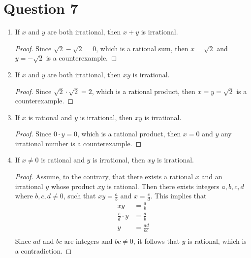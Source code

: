 \documentclass[11pt, oneside]{article}   	%
\begin{document}
\section*{Question 7}

\begin{enumerate}[ (a)]
	\item If $x$ and $y$ are both irrational, then $x+y$ is irrational.
	\begin{proof}
		Since $\sqrt{2} - \sqrt{2} = 0$, which is a rational sum, then $x=\sqrt{2}$ and $y=-\sqrt{2}$ is a counterexample.
	\end{proof}
	
	\item If $x$ and $y$ are both irrational, then $xy$ is irrational.
	\begin{proof}
		Since $\sqrt{2} \cdot \sqrt{2} = 2$, which is a rational product, then $x=y=\sqrt{2}$ is a counterexample.
	\end{proof}
	
	\item If $x$ is rational and $y$ is irrational, then $xy$ is irrational.
	\begin{proof}
		Since $0 \cdot y = 0$, which is a rational product, then $x=0$ and $y$ any irrational number is a counterexample.
	\end{proof}
	
	
	\item If $x\neq0$ is rational and $y$ is irrational, then $xy$ is irrational.
	\begin{proof}
		Assume, to the contrary, that there exists a rational $x$ and an irrational $y$ whose product $xy$ is rational. Then there exists integers $a,b,c,d$ where $b,c,d \neq 0$, such that $xy=\frac{a}{b}$ and $x=\frac{c}{d}$. This implies that
		\begin{align*}
			xy & = \frac{a}{b} \\
			\frac{c}{d} \cdot y & = \frac{a}{b} \\
			y & = \frac{ad}{bc} \\
		\end{align*}
		Since $ad$ and $bc$ are integers and $bc\neq 0$, it follows that $y$ is rational, which is a contradiction.
	\end{proof}
	

\end{enumerate}
\end{document}
